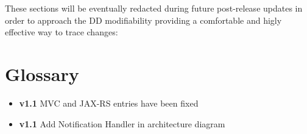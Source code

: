 These sections will be eventually redacted during future post-release updates in order to approach the DD modifiability providing a comfortable and higly effective way to trace changes:
\section{Glossary}
	\begin{itemize}
		\item \textbf{v1.1} MVC and JAX-RS entries have been fixed
		\item \textbf{v1.1} Add Notification Handler in architecture diagram
	\end{itemize}